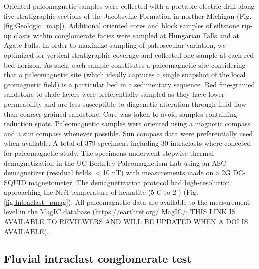 \documentclass[draft]{agujournal2019}
\begin{document}
Oriented paleomagnetic samples were collected with a portable electric drill along five stratigraphic sections of the Jacobsville Formation in norther Michigan (Fig. \ref{fig:Geologic_map}). Additional oriented cores and block samples of siltstone rip-up clasts within conglomerate facies were sampled at Hungarian Falls and at Agate Falls. In order to maximize sampling of paleosecular variation, we optimized for vertical stratigraphic coverage and collected one sample at each red bed horizon. As such, each sample constitutes a paleomagnetic site considering that a paleomagnetic site (which ideally captures a single snapshot of the local geomagnetic field) is a particular bed in a sedimentary sequence. Red fine-grained sandstone to shale layers were preferentially sampled as they have lower permeability and are less susceptible to diagenetic alteration through fluid flow than coarser grained sandstone. Care was taken to avoid samples containing reduction spots. Paleomagnetic samples were oriented using a magnetic compass and a sun compass whenever possible. Sun compass data were preferentially used when available. A total of 379 specimens including 30 intraclasts where collected for paleomagnetic study. The specimens underwent stepwise thermal demagnetization in the UC Berkeley Paleomagnetism Lab using an ASC demagnetizer (residual fields $<$10 nT) with measurements made on a 2G DC-SQUID magnetometer. The demagnetization protocol had high-resolution approaching the Ne\'el temperature of hematite (5 \textdegree C to 2 \textdegreeC) (Fig. \ref{fig:Intraclast_pmag}). All paleomagnetic data are available to the measurement level in the MagIC database (https://earthref.org/ MagIC/; THIS LINK IS AVAILABLE TO REVIEWERS AND WILL BE UPDATED WHEN A DOI IS AVAILABLE).


\subsection*{Fluvial intraclast conglomerate test}
\end{document}
